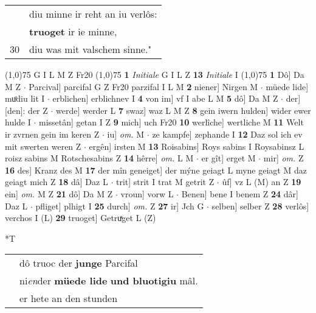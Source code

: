 \documentclass[8pt,a4paper,notitlepage]{article}
\begin{document}
\begin{table}[ht]
\begin{minipage}[t]{0.5\linewidth}
\begin{tabular}{rl}
 & diu minne ir reht an iu verlôs:\\ 
 & \textbf{truoget} ir ie minne,\\ 
30 & diu was mit valschem sinne."\\ 
\end{tabular}
\scriptsize
\line(1,0){75} \newline
G I L M Z Fr20 \newline
\line(1,0){75} \newline
\textbf{1} \textit{Initiale} G I L Z  \textbf{13} \textit{Initiale} I  \newline
\line(1,0){75} \newline
\textbf{1} Dô] Da M Z  $\cdot$ Parcival] parcifal G Z Fr20 parzifal I L M \textbf{2} niener] Nirgen M  $\cdot$ müede lide] muͦdiu lit I  $\cdot$ erblichen] erblichnev I \textbf{4} von im] vf I abe L M \textbf{5} dô] Da M Z  $\cdot$ der] [den]: der Z  $\cdot$ werde] werder L \textbf{7} swaz] waz L M Z \textbf{8} gein iwern hulden] wider ewer hulde I  $\cdot$ missetân] getan I Z \textbf{9} mich] uch Fr20 \textbf{10} werlîche] wertliche M \textbf{11} Welt ir zvrnen gein im keren Z  $\cdot$ iu] \textit{om.} M  $\cdot$ ze kampfe] zephande I \textbf{12} Daz sol ich ev mit swerten weren Z  $\cdot$ ergên] irsten M \textbf{13} Roisabins] Roys sabins I Roysabinsz L roisz sabins M Rotschesabins Z \textbf{14} hêrre] \textit{om.} L M  $\cdot$ er gît] erget M  $\cdot$ mir] \textit{om.} Z \textbf{16} des] Kranz des M \textbf{17} der mîn geneiget] der mýne geiagt L myne geiagt M daz geiagt mich Z \textbf{18} dâ] Daz L  $\cdot$ trit] strit I trat M getrit Z  $\cdot$ ûf] vz L (M) an Z \textbf{19} ein] \textit{om.} M Z \textbf{21} dô] Da M Z  $\cdot$ vroun] vorw L  $\cdot$ Benen] bene I benem Z \textbf{24} dâr] Daz L  $\cdot$ pfliget] plhigt I \textbf{25} durch] \textit{om.} Z \textbf{27} ir] Jch G  $\cdot$ selben] selber Z \textbf{28} verlôs] verchos I (L) \textbf{29} truoget] Getruͯget L (Z) \newline
\end{minipage}
\hspace{0.5cm}
\begin{minipage}[t]{0.5\linewidth}
\small
\begin{center}*T
\end{center}
\begin{tabular}{rl}
 & dô truoc der \textbf{junge} Parcifal\\ 
 & ni\textit{en}der \textbf{müede lide} \textbf{und bluotigiu} mâl.\\ 
 & er hete an den stunden\\ 

\end{tabular}
\end{minipage}
\end{table}
\end{document}
